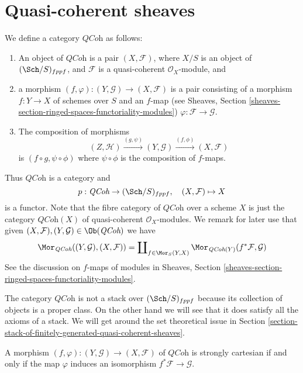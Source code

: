 \section{Quasi-coherent sheaves}
\label{section-stack-of-quasi-coherent-sheaves}

\noindent
We define a category $\textit{QCoh}$ as follows:
\begin{enumerate}
\item An object of $\textit{QCoh}$ is a pair $(X, \mathcal{F})$,
where $X/S$ is an object of $(\Sch/S)_{fppf}$, and $\mathcal{F}$
is a quasi-coherent $\mathcal{O}_X$-module, and
\item a morphism $(f, \varphi) : (Y, \mathcal{G}) \to (X, \mathcal{F})$
is a pair consisting of a morphism $f : Y \to X$ of schemes over $S$
and an $f$-map (see
Sheaves, Section \ref{sheaves-section-ringed-spaces-functoriality-modules})
$\varphi : \mathcal{F} \to \mathcal{G}$.
\item The composition of morphisms
$$
(Z, \mathcal{H}) \xrightarrow{(g, \psi)}
(Y, \mathcal{G}) \xrightarrow{(f, \phi)} (X, \mathcal{F})
$$
is $(f \circ g, \psi \circ \phi)$ where $\psi \circ \phi$ is
the composition of $f$-maps.
\end{enumerate}
Thus $\textit{QCoh}$ is a category and
$$
p : \textit{QCoh} \to (\Sch/S)_{fppf},
\quad
(X, \mathcal{F}) \mapsto X
$$
is a functor. Note that the fibre category of $\textit{QCoh}$ over
a scheme $X$ is just the category $\textit{QCoh}(X)$
of quasi-coherent $\mathcal{O}_X$-modules.
We remark for later use that given
$(X, \mathcal{F}), (Y, \mathcal{G}) \in \Ob(\textit{QCoh})$
we have
\begin{equation}
\label{equation-morphisms-qcoh}
\Mor_{\textit{QCoh}}((Y, \mathcal{G}), (X, \mathcal{F}))
=
\coprod\nolimits_{f \in \Mor_S(Y, X)}
\Mor_{\textit{QCoh}(Y)}(f^*\mathcal{F}, \mathcal{G})
\end{equation}
See the discussion on $f$-maps of modules in
Sheaves, Section \ref{sheaves-section-ringed-spaces-functoriality-modules}.

\medskip\noindent
The category $\textit{QCoh}$ is not a stack over $(\Sch/S)_{fppf}$
because its collection of objects is a proper class. On the other hand
we will see that it does satisfy all the axioms of a stack. We will
get around the set theoretical issue in
Section \ref{section-stack-of-finitely-generated-quasi-coherent-sheaves}.

\begin{lemma}
\label{lemma-quasi-coherent-strongly-cartesian}
A morphism $(f, \varphi) : (Y, \mathcal{G}) \to (X, \mathcal{F})$
of $\textit{QCoh}$ is strongly cartesian if and only if the
map $\varphi$ induces an isomorphism $f^*\mathcal{F} \to \mathcal{G}$.
\end{lemma}

